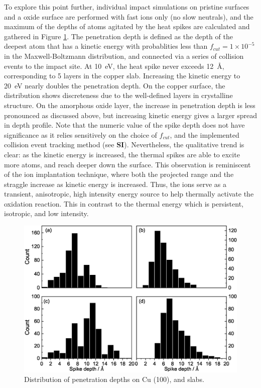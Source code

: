 \documentclass[manuscript=cmatex]{achemso}
\begin{document}
To explore this point further, individual impact simulations on pristine  surfaces and a oxide surface are performed with fast ions only (no slow neutrals), and the maximum of the depths of atoms agitated by the heat spikes are calculated and gathered in Figure \ref{fig:spikes}. The penetration depth is defined as the depth of the deepest atom that has a kinetic energy with probablities less than $f_{cut}=1\times10^{-5}$ in the Maxwell-Boltzmann distribution, and connected via a series of collision events to the impact site. At \SI{10}{eV}, the heat spike never exceeds \SI{12}{\AA}, corresponding to 5 layers in the copper slab. Increasing the kinetic energy to \SI{20}{eV} nearly doubles the penetration depth. On the  copper surface, the distribution shows discreteness due to the well-defined layers in crystalline structure. On the amorphous oxide layer, the increase in penetration depth is less pronounced as discussed above, but increasing kinetic energy gives a larger spread in depth profile. Note that the numeric value of the spike depth does not have significance as it relies sensitively on the choice of $f_{cut}$, and the implemented collision event tracking method (see \textbf{SI}). Nevertheless, the qualitative trend is clear: as the kinetic energy is increased, the thermal spikes are able to excite more atoms, and reach deeper down the surface. This observation is reminiscent of the ion implantation technique, where both the projected range and the straggle increase as kinetic energy is increased. Thus, the ions serve as a transient, anisotropic, high intensity energy source to help thermally activate the oxidation reaction. This in contrast to the thermal energy which is persistent, isotropic, and low intensity. 

\begin{figure}[h]
  \centering
  \includegraphics[width=\textwidth]{spikes}
  \caption[Distribution of penetration depths on Cu]{Distribution of penetration depths on Cu (100), and  slabs.}
  \label{fig:spikes}
\end{figure}
\end{document}
